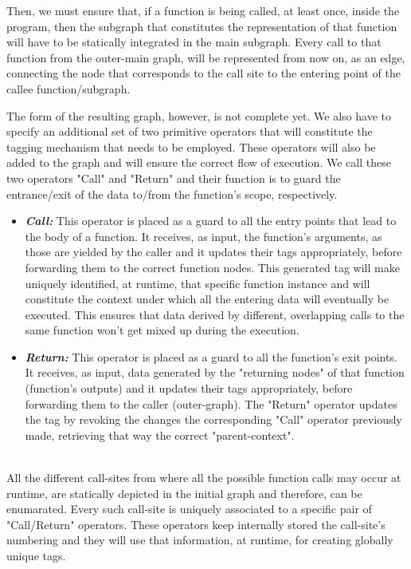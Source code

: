 \documentclass[ack,preface]{dithesis}
\begin{document}
Then, we must ensure that, if a function is being called, at least once, inside the program, then the subgraph that constitutes the representation of that function will have to be statically integrated in the main subgraph. Every call to that function from the outer-main graph, will be represented from now on, as an edge, connecting the node that corresponds to the call site to the entering point of the callee function/subgraph.

The form of the resulting graph, however, is not complete yet. We also have to specify an additional set of two primitive operators that will constitute the tagging mechanism that needs to be employed. These operators will also be added to the graph and will ensure the correct flow of execution.
We call these two operators "Call" and "Return" and their function is to guard the entrance/exit of the data to/from the function's scope, respectively.

    \begin{itemize}

    \item \textit{\textbf{Call:}} This operator is placed as a guard to all the entry points that lead to the body of a function. It receives, as input, the function's arguments, as those are yielded by the caller and it updates their tags appropriately, before forwarding them to the correct function nodes. This generated tag will make uniquely identified, at runtime, that specific function instance and will constitute the context under which all the entering data will eventually be executed. This ensures that data derived by different, overlapping calls to the same function won't get mixed up during the execution.

    \item \textit{\textbf{Return:}} This operator is placed as a guard to all the function's exit points. It receives, as input, data generated by the "returning nodes" of that function (function's outputs) and it updates their tags appropriately, before forwarding them to the caller (outer-graph).  The "Return" operator updates the tag by revoking the changes the corresponding "Call" operator previously made, retrieving that way the correct "parent-context".\\\\

    \end{itemize}

All the different call-sites from where all the possible function calls may occur at runtime, are statically depicted in the initial graph and therefore, can be enumarated.
Every such call-site is uniquely associated to a specific pair of "Call/Return" operators. These operators keep internally stored the call-site's numbering and they will use that information, at runtime, for creating globally unique tags. 
\end{document}
